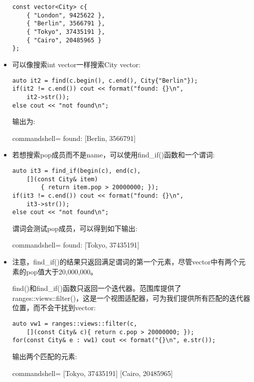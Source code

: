 \begin{itemize}
\begin{lstlisting}[style=styleCXX]
const vector<City> c{
	{ "London", 9425622 },
	{ "Berlin", 3566791 },
	{ "Tokyo", 37435191 },
	{ "Cairo", 20485965 }
};
\end{lstlisting}

\item 
可以像搜索int vector一样搜索City vector:

\begin{lstlisting}[style=styleCXX]
auto it2 = find(c.begin(), c.end(), City{"Berlin"});
if(it2 != c.end()) cout << format("found: {}\n",
	it2->str());
else cout << "not found\n";
\end{lstlisting}

输出为:

\begin{tcblisting}{commandshell={}}
found: [Berlin, 3566791]
\end{tcblisting}

\item 
若想搜索pop成员而不是name，可以使用find\_if()函数和一个谓词:

\begin{lstlisting}[style=styleCXX]
auto it3 = find_if(begin(c), end(c),
	[](const City& item)
		{ return item.pop > 20000000; });
if(it3 != c.end()) cout << format("found: {}\n",
	it3->str());
else cout << "not found\n";
\end{lstlisting}

谓词会测试pop成员，可以得到如下输出:

\begin{tcblisting}{commandshell={}}
found: [Tokyo, 37435191]
\end{tcblisting}

\item 
注意，find\_if()的结果只返回满足谓词的第一个元素，尽管vector中有两个元素的pop值大于20,000,000。

find()和find\_if()函数只返回一个迭代器。范围库提供了ranges::views::filter()，这是一个视图适配器，可为我们提供所有匹配的迭代器位置，而不会干扰到vector:

\begin{lstlisting}[style=styleCXX]
auto vw1 = ranges::views::filter(c,
	[](const City& c){ return c.pop > 20000000; });
for(const City& e : vw1) cout << format("{}\n", e.str());
\end{lstlisting}

输出两个匹配的元素:

\begin{tcblisting}{commandshell={}}
[Tokyo, 37435191]
[Cairo, 20485965]
\end{tcblisting}
\end{itemize}

